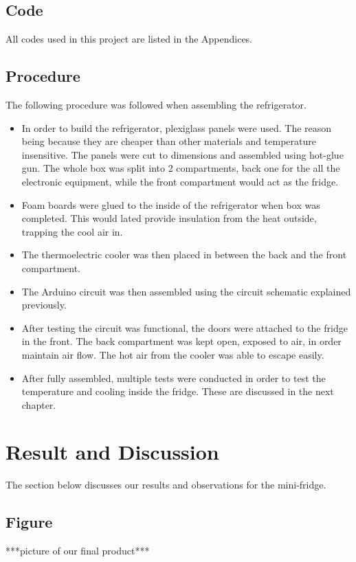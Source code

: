\documentclass[12pt,a4paper]{report}
\begin{document}
\section{Code}
All codes used in this project are listed in the Appendices.

\section{Procedure}
The following procedure was followed when assembling the refrigerator. 
\begin{itemize}\itemsep -2pt
	\item In order to build the refrigerator, plexiglass panels were used. The reason being because they are cheaper than other materials and temperature insensitive. The panels were cut to dimensions and assembled using hot-glue gun. The whole box was split into 2 compartments, back one for the all the electronic equipment, while the front compartment would act as the fridge.
	\item Foam boards were glued to the inside of the refrigerator when box was completed. This would lated provide insulation from the heat outside, trapping the cool air in. 
	\item The thermoelectric cooler was then placed in between the back and the front compartment. 
	\item The Arduino circuit was then assembled using the circuit schematic explained previously. 
	\item After testing the circuit was functional, the doors were attached to the fridge in the front. The back compartment was kept open, exposed to air, in order maintain air flow. The hot air from the cooler was able to escape easily. 
	\item After fully assembled, multiple tests were conducted in order to test the temperature and cooling inside the fridge. These are discussed in the next chapter. 
\end{itemize}

\chapter{Result and Discussion}
The section below discusses our results and observations for the mini-fridge. 

\section{Figure}
 ***picture of our final product***
\end{document}
